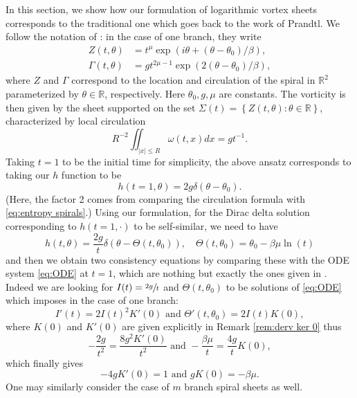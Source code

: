 \documentclass[JEP,XML,SOM,Unicode,NoFloatCountersInSection,published]{cedram}
\theoremstyle{plain}
\theoremstyle{definition}
\let\bt\beta
\let\Gmm\Gamma
\let\dlt\delta
\let\tht\theta
\let\omg\omega
\newcommand{\bbR}{\mathbb R}
\begin{document}
In this section, we show how our formulation of logarithmic vortex sheets corresponds to the traditional one which goes back to the work of Prandtl. We follow the notation of \cite{CKW21,CKW22}: in the case of one branch, they write
\begin{equation*}
\begin{split}
Z(t,\tht) & = t^{\mu} \exp(i\tht + (\tht-\tht_{0})/\beta), \\
\Gmm(t,\tht) & = g t^{2\mu - 1} \exp(2(\tht-\tht_{0})/\beta),
\end{split}
\end{equation*}
where $Z$ and $\Gmm$ correspond to the location and circulation of the spiral in $\bbR^2$ parameterized by $\tht\in \bbR$, respectively. Here $\tht_{0},g,\mu$ are constants. The vorticity is then given by the sheet supported on the set $\Sigma(t) = \left\{ Z(t,\tht) : \tht \in \bbR \right\} $, characterized by local circulation
\begin{equation*}
R^{-2}\iint_{|x|\le R} \omg(t,x) dx = gt^{-1}.
\end{equation*}
Taking $t = 1$ to be the initial time for simplicity, the above ansatz corresponds to taking our $h$ function to be
\begin{equation*}
h(t=1,\tht) = 2g \dlt(\tht-\tht_{0}).
\end{equation*}
(Here, the factor 2 comes from comparing the circulation formula with \eqref{eq:entropy spirals}.) Using our formulation, for the Dirac delta solution corresponding to $h(t=1,\cdot)$ to be self-similar, we need to have
\begin{equation*}
h(t,\tht) = \frac{2g}{t} \dlt(\tht - \Theta(t,\tht_{0})), \quad \Theta(t,\tht_0) = \tht_0 - \bt\mu \ln(t)
\end{equation*}
and then we obtain two consistency equations by comparing these with the ODE system \eqref{eq:ODE} at $t=1$, which are nothing but exactly the ones given in \cite[Cor.\,1.3]{CKW21}. Indeed we are looking for $I(t)=\sfrac{2g}{t}$ and $\Theta(t,\theta_0)$ to be solutions of \eqref{eq:ODE} which imposes in the case of one branch:
\[
I'(t)=2I(t)^2K'(0) \text{ and } \Theta'(t,\theta_0)=2I(t)K(0),
\]
where $K(0)$ and $K'(0)$ are given explicitly in Remark \eqref{rem:derv ker 0} thus
\[
-\frac{2g}{t^2}=\frac{8g^2 K'(0)}{t^2} \text{ and } -\frac{\beta \mu}{t}=\frac{4g}{t}K(0),
\]
which finally gives
\[
-4gK'(0)=1 \text{ and }gK(0)=-\beta\mu.
\]
One may similarly consider the case of $m$ branch spiral sheets as well.




\end{document}
